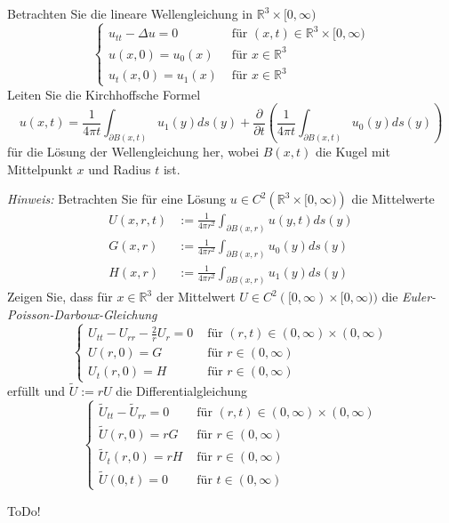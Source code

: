 
\begin{exercise}

Betrachten Sie die lineare Wellengleichung in $\mathbb{R}^{3} \times[0, \infty)$
$$
\left\{\begin{array}{ll}
u_{t t}-\Delta u=0 & \text { für }(x, t) \in \mathbb{R}^{3} \times[0, \infty) \\
u(x, 0)=u_{0}(x) & \text { für } x \in \mathbb{R}^{3} \\
u_{t}(x, 0)=u_{1}(x) & \text { für } x \in \mathbb{R}^{3}
\end{array}\right.
$$
Leiten Sie die Kirchhoffsche Formel
$$
u(x, t)=\frac{1}{4 \pi t} \int_{\partial B(x, t)} u_{1}(y) d s(y)+\frac{\partial}{\partial t}\left(\frac{1}{4 \pi t} \int_{\partial B(x, t)} u_{0}(y) d s(y)\right)
$$
für die Lösung der Wellengleichung her, wobei $B(x, t)$ die Kugel mit Mittelpunkt $x$ und Radius $t$ ist.

\textit{Hinweis:} Betrachten Sie für eine Lösung $u \in C^{2}\left(\mathbb{R}^{3} \times[0, \infty)\right)$ die Mittelwerte
$$
\begin{aligned}
U(x, r, t) &:=\frac{1}{4 \pi r^{2}} \int_{\partial B(x, r)} u(y, t) d s(y) \\
G(x, r) &:=\frac{1}{4 \pi r^{2}} \int_{\partial B(x, r)} u_{0}(y) d s(y) \\
H(x, r) &:=\frac{1}{4 \pi r^{2}} \int_{\partial B(x, r)} u_{1}(y) d s(y)
\end{aligned}
$$
Zeigen Sie, dass für $x \in \mathbb{R}^{3}$ der Mittelwert $U \in C^{2}([0, \infty) \times[0, \infty))$  die \textit{Euler-Poisson-Darboux-Gleichung}
$$
\left\{\begin{array}{ll}
U_{t t}-U_{r r}-\frac{2}{r} U_{r}=0 & \text { für }(r, t) \in(0, \infty) \times(0, \infty) \\
U(r, 0)=G & \text { für } r \in(0, \infty) \\
U_{t}(r, 0)=H & \text { für } r \in(0, \infty)
\end{array}\right.
$$
erfüllt und $\tilde{U}:=r U$ die Differentialgleichung
$$
\left\{\begin{array}{ll}
\tilde{U}_{t t}-\tilde{U}_{r r}=0 & \text { für }(r, t) \in(0, \infty) \times(0, \infty) \\
\tilde{U}(r, 0)=r G & \text { für } r \in(0, \infty) \\
\tilde{U}_{t}(r, 0)=r H & \text { für } r \in(0, \infty) \\
\tilde{U}(0, t)=0 & \text { für } t \in(0, \infty)
\end{array}\right.
$$
\end{exercise}


\begin{solution}

ToDo!

\end{solution}

